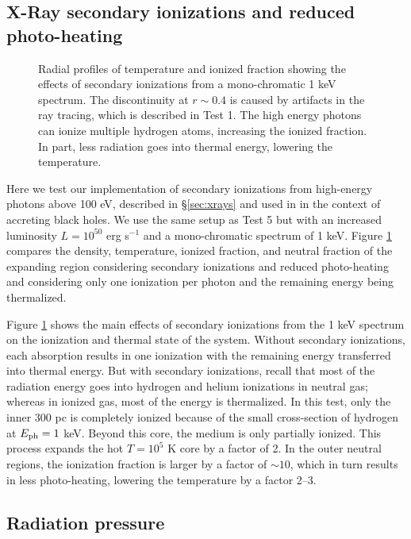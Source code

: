 \documentclass[useAMS,usenatbib,a4paper]{mn2e}
\begin{document}
\subsection{X-Ray secondary ionizations and reduced photo-heating}

\begin{figure}
  \caption{\label{fig:xray_fig} Radial profiles of temperature and
    ionized fraction showing the effects of secondary ionizations from
    a mono-chromatic 1 keV spectrum.  The discontinuity at $r \sim
    0.4$ is caused by artifacts in the ray tracing, which is described
    in Test 1.  The high energy photons can ionize multiple hydrogen
    atoms, increasing the ionized fraction.  In part, less radiation
    goes into thermal energy, lowering the temperature.}
\end{figure}

Here we test our implementation of secondary ionizations from
high-energy photons above 100 eV, described in \S\ref{sec:xrays} and
used in \citet{Alvarez09} in the context of accreting black holes.  We
use the same setup as Test 5 but with an increased luminosity $L =
10^{50}$ erg s$^{-1}$ and a mono-chromatic spectrum of 1 keV.  Figure
\ref{fig:xray_fig} compares the density, temperature, ionized
fraction, and neutral fraction of the expanding \hii region
considering secondary ionizations and reduced photo-heating and
considering only one ionization per photon and the remaining energy
being thermalized.

Figure \ref{fig:xray_fig} shows the main effects of secondary
ionizations from the 1 keV spectrum on the ionization and thermal
state of the system.  Without secondary ionizations, each absorption
results in one ionization with the remaining energy transferred into
thermal energy.  But with secondary ionizations, recall that most of
the radiation energy goes into hydrogen and helium ionizations in
neutral gas; whereas in ionized gas, most of the energy is
thermalized.  In this test, only the inner 300 pc is completely
ionized because of the small cross-section of hydrogen at $E_{\rm ph}
= 1$ keV.  Beyond this core, the medium is only partially ionized.
This process expands the hot $T = 10^5$ K core by a factor of 2.  In
the outer neutral regions, the ionization fraction is larger by a
factor of $\sim 10$, which in turn results in less photo-heating,
lowering the temperature by a factor 2--3.

\subsection{Radiation pressure}
\end{document}
